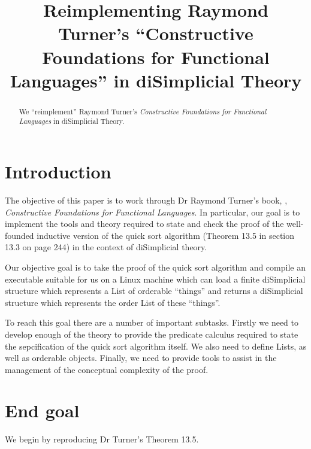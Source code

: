\documentclass[a4paper,openany]{amsbook}
\begin{document}
\frontmatter
\sloppy

\title[Constructive Foundations]{Reimplementing Raymond Turner's ``Constructive Foundations 
for Functional Languages'' in diSimplicial Theory}

%

\begin{abstract}
We ``reimplement'' Raymond Turner's \emph{Constructive Foundations for Functional
Languages} in diSimplicial Theory.
\end{abstract} 
\maketitle 
\tableofcontents 
\mainmatter

\section{Introduction}

The objective of this paper is to work through Dr Raymond Turner's book,
\cite{turner1991constructiveFoundations}, \emph{Constructive Foundations for
Functional Languages}. In particular, our goal is to implement the tools and
theory required to state and check the proof of the well-founded inductive
version of the quick sort algorithm (Theorem 13.5 in section 13.3 on page 244)
in the context of diSimplicial theory.

Our objective goal is to take the proof of the quick sort algorithm and compile
an executable suitable for us on a Linux machine which can load a finite
diSimplicial structure which represents a List of orderable ``things'' and
returns a diSimplicial structure which represents the order List of these
``things''.

To reach this goal there are a number of important subtasks. Firstly we need to
develop enough of the theory to provide the predicate calculus required to state
the sepcification of the quick sort algorithm itself. We also need to define
Lists, as well as orderable objects. Finally, we need to provide tools to assist
in the management of the conceptual complexity of the proof.

\section{End goal}

We begin by reproducing Dr Turner's Theorem 13.5.
\end{document}
